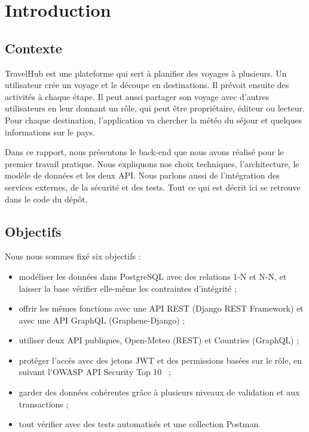 \section{Introduction}
\label{sec:introduction}

\subsection{Contexte}

TravelHub est une plateforme qui sert à planifier des voyages à plusieurs. Un utilisateur crée un voyage et le découpe en destinations. Il prévoit ensuite des activités à chaque étape. Il peut aussi partager son voyage avec d'autres utilisateurs en leur donnant un rôle, qui peut être propriétaire, éditeur ou lecteur. Pour chaque destination, l'application va chercher la météo du séjour et quelques informations sur le pays.

Dans ce rapport, nous présentons le back-end que nous avons réalisé pour le premier travail pratique. Nous expliquons nos choix techniques, l'architecture, le modèle de données et les deux API. Nous parlons aussi de l'intégration des services externes, de la sécurité et des tests. Tout ce qui est décrit ici se retrouve dans le code du dépôt.

\subsection{Objectifs}

Nous nous sommes fixé six objectifs :
\begin{itemize}
  \item modéliser les données dans PostgreSQL avec des relations 1-N et N-N, et laisser la base vérifier elle-même les contraintes d'intégrité ;
  \item offrir les mêmes fonctions avec une API REST (Django REST Framework) et avec une API GraphQL (Graphene-Django) ;
  \item utiliser deux API publiques, Open-Meteo (REST) et Countries (GraphQL) ;
  \item protéger l'accès avec des jetons JWT et des permissions basées sur le rôle, en suivant l'OWASP API Security Top 10~\cite{owasp} ;
  \item garder des données cohérentes grâce à plusieurs niveaux de validation et aux transactions ;
  \item tout vérifier avec des tests automatisés et une collection Postman.
\end{itemize}


